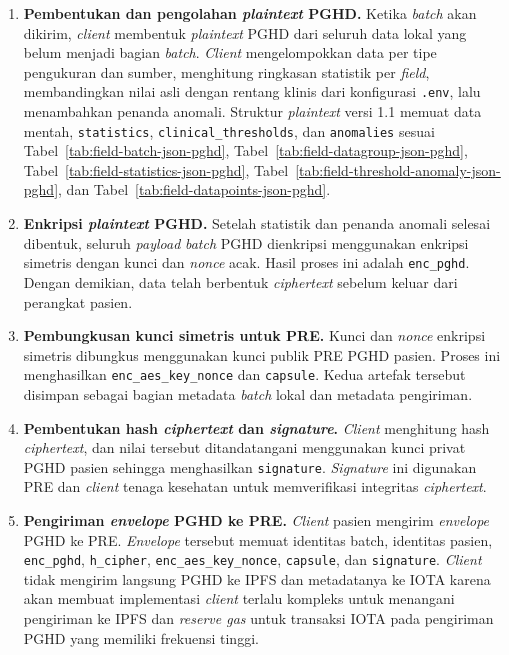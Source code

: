 \begin{enumerate}
    \item \textbf{Pembentukan dan pengolahan \textit{plaintext} PGHD\@.}
    Ketika \textit{batch} akan dikirim, \textit{client} membentuk \textit{plaintext} PGHD dari seluruh data lokal yang belum menjadi bagian \textit{batch}. \textit{Client} mengelompokkan data per tipe pengukuran dan sumber, menghitung ringkasan statistik per \textit{field}, membandingkan nilai asli dengan rentang klinis dari konfigurasi \texttt{.env}, lalu menambahkan penanda anomali. Struktur \textit{plaintext} versi 1.1 memuat data mentah, \texttt{statistics}, \texttt{clinical\_thresholds}, dan \texttt{anomalies} sesuai Tabel~\ref{tab:field-batch-json-pghd}, Tabel~\ref{tab:field-datagroup-json-pghd}, Tabel~\ref{tab:field-statistics-json-pghd}, Tabel~\ref{tab:field-threshold-anomaly-json-pghd}, dan Tabel~\ref{tab:field-datapoints-json-pghd}.

    \item \textbf{Enkripsi \textit{plaintext} PGHD\@.}
    Setelah statistik dan penanda anomali selesai dibentuk, seluruh \textit{payload} \textit{batch} PGHD dienkripsi menggunakan enkripsi simetris dengan kunci dan \textit{nonce} acak.
    Hasil proses ini adalah \texttt{enc\_pghd}. 
    Dengan demikian, data telah berbentuk \textit{ciphertext} sebelum keluar dari perangkat pasien.

    \item \textbf{Pembungkusan kunci simetris untuk PRE.}
    Kunci dan \textit{nonce} enkripsi simetris dibungkus menggunakan kunci publik PRE PGHD pasien. 
    Proses ini menghasilkan \texttt{enc\_aes\_key\_nonce} dan \texttt{capsule}. 
    Kedua artefak tersebut disimpan sebagai bagian metadata \textit{batch} lokal dan metadata pengiriman.

    \item \textbf{Pembentukan hash \textit{ciphertext} dan \textit{signature}.}
    \textit{Client} menghitung hash \textit{ciphertext}, dan nilai tersebut ditandatangani menggunakan kunci privat PGHD pasien sehingga menghasilkan \texttt{signature}. 
    \textit{Signature} ini digunakan PRE dan \textit{client} tenaga kesehatan untuk memverifikasi integritas \textit{ciphertext}.

    \item \textbf{Pengiriman \textit{envelope} PGHD ke PRE.}
    \textit{Client} pasien mengirim \textit{envelope} PGHD ke PRE\@. 
    \textit{Envelope} tersebut memuat identitas batch, identitas pasien, \texttt{enc\_pghd}, \texttt{h\_cipher}, \texttt{enc\_aes\_key\_nonce}, \texttt{capsule}, dan \texttt{signature}. 
    \textit{Client} tidak mengirim langsung PGHD ke IPFS dan metadatanya ke IOTA karena akan membuat implementasi \textit{client} terlalu kompleks untuk menangani pengiriman ke IPFS dan \textit{reserve gas} untuk transaksi IOTA pada pengiriman PGHD yang memiliki frekuensi tinggi.
    

\end{enumerate}
